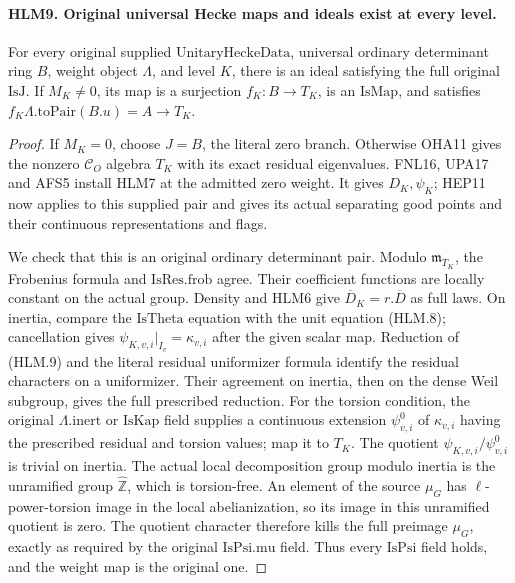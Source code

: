 \documentclass[11pt,a4paper]{article}
\numberwithin{equation}{section}
\theoremstyle{remark}\newtheorem{remark}[theorem]{Remark}
\begin{document}
\paragraph{HLM9. Original universal Hecke maps and ideals exist at every level.}
\label{claim:HLM9}
For every original supplied \(\mathrm{UnitaryHeckeData}\),
universal ordinary determinant ring \(B\), weight object
\(\Lambda\), and level \(K\), there is an ideal satisfying
the full original \(\mathrm{IsJ}\).  If \(M_K\ne0\), its
map is a surjection \(f_K:B\to T_K\), is an
\(\mathrm{IsMap}\), and satisfies
\(f_K\Lambda.\mathrm{toPair}(B.u)=A\to T_K\).
\begin{proof}
If \(M_K=0\), choose \(J=B\), the literal zero branch.
Otherwise OHA11 gives the nonzero \(\mathcal C_O\) algebra
\(T_K\) with its exact residual eigenvalues.  FNL16,
UPA17 and AFS5 install HLM7 at the admitted zero weight.
It gives \(D_K,\psi_K\); HEP11 now applies to this supplied
pair and gives its actual separating good points and their
continuous representations and flags.

We check that this is an original ordinary determinant pair.
Modulo \(\mathfrak m_{T_K}\), the Frobenius formula and
\(\mathrm{IsRes.frob}\) agree.  Their coefficient functions
are locally constant on the actual group.  Density and HLM6
give \(\overline D_K=r.\overline D\) as full laws.
On inertia, compare the \(\mathrm{IsTheta}\) equation with
the unit equation (HLM.8); cancellation gives
\(\psi_{K,v,i}|_{I_v}=\kappa_{v,i}\) after the given
scalar map.  Reduction of (HLM.9) and the literal residual
uniformizer formula identify the residual characters on a
uniformizer.  Their agreement on inertia, then on the dense
Weil subgroup, gives the full prescribed reduction.  For the
torsion condition, the original \(\Lambda.\mathrm{inert}\)
or \(\mathrm{IsKap}\) field supplies a continuous extension
\(\psi^0_{v,i}\) of \(\kappa_{v,i}\) having the prescribed
residual and torsion values; map it to \(T_K\).  The quotient
\(\psi_{K,v,i}/\psi^0_{v,i}\) is trivial on inertia.
The actual local decomposition group modulo inertia is the
unramified group \(\widehat{\mathbb Z}\), which is
torsion-free.  An element of the source \(\mu_G\) has
\(\ell\)-power-torsion image in the local abelianization,
so its image in this unramified quotient is zero.  The
quotient character therefore kills the full preimage
\(\mu_G\), exactly as required by the original
\(\mathrm{IsPsi.mu}\) field.  Thus every \(\mathrm{IsPsi}\) field
holds, and the weight map is the original one.


\end{proof}
\end{document}

